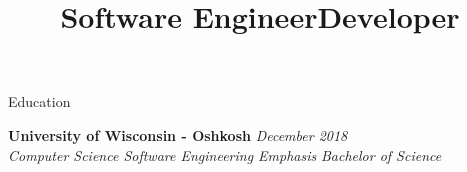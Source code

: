 \documentclass{resume} %
\title{Software Engineer} %
\title{Developer} %
\begin{document}

\begin{rSection}{Education}

{\bf University of Wisconsin - Oshkosh} \hfill {\em December 2018} \\
{\em Computer Science \seperator Software Engineering Emphasis} \hfill {\em Bachelor of Science}

\end{rSection}

\end{document}
